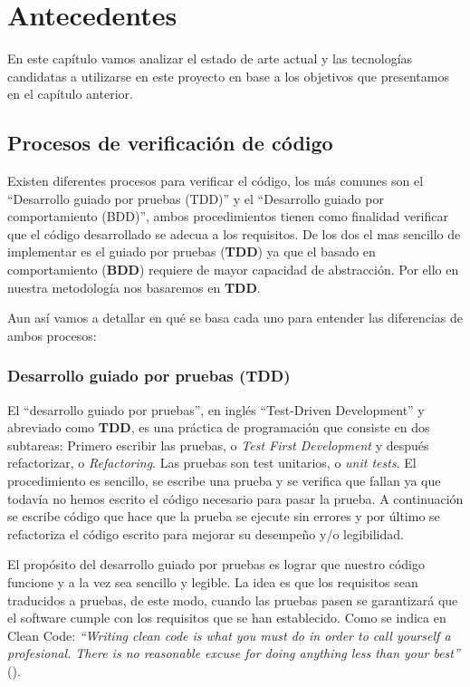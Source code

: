 \chapter{Antecedentes}

En este capítulo vamos analizar el estado de arte actual y las tecnologías candidatas a utilizarse en este proyecto en base a los objetivos que presentamos en el capítulo anterior.


\section {Procesos de verificación de código}

Existen diferentes procesos para verificar el código, los más comunes son el ``Desarrollo guiado por pruebas (TDD)'' y el ``Desarrollo guiado por comportamiento (BDD)'', ambos procedimientos tienen como finalidad verificar que el código desarrollado se adecua a los requisitos. De los dos el mas sencillo de implementar es el guiado por pruebas (\textbf{TDD}) ya que el basado en comportamiento (\textbf{BDD}) requiere de mayor capacidad de abstracción. Por ello en nuestra metodología nos basaremos en \textbf{TDD}.

\bigskip
Aun así vamos a detallar en qué se basa cada uno para entender las diferencias de ambos procesos:

\subsection {Desarrollo guiado por pruebas (TDD)}

El ``desarrollo guiado por pruebas'', en inglés ``Test-Driven Development'' y abreviado como \textbf{TDD}, es una práctica de programación que consiste en dos subtareas: Primero escribir las pruebas, o \textit{Test First Development} y después refactorizar, o \textit{Refactoring}. Las pruebas son test unitarios, o \textit{unit tests}. El procedimiento es sencillo, se escribe una prueba y se verifica que fallan ya que todavía no hemos escrito el código necesario para pasar la prueba. A continuación se escribe código que hace que la prueba se ejecute sin errores y por último se refactoriza el código escrito para mejorar su desempeño y/o legibilidad.

\bigskip
El propósito del desarrollo guiado por pruebas es lograr que nuestro código funcione y a la vez sea sencillo y legible. La idea es que los requisitos sean traducidos a pruebas, de este modo, cuando las pruebas pasen se garantizará que el software cumple con los requisitos que se han establecido. Como se indica en Clean Code: \textit{``Writing clean code is what you must do in order to call yourself a profesional. There is no reasonable excuse for doing anything less than your best''} (\cite{martin_clean_2009}).

